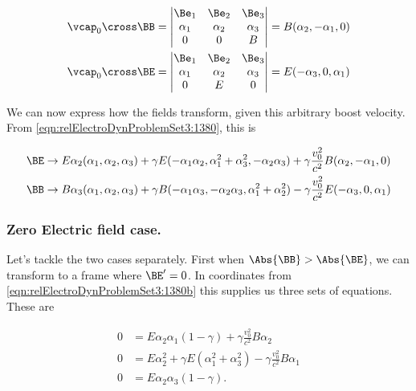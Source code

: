 \begin{align*}
\vcap_0 \cross \BB &= 
        \begin{vmatrix} 
        \Be_1 & \Be_2 & \Be_3 \\
        \alpha_1 & \alpha_2 & \alpha_3 \\
        0 & 0 & B 
        \end{vmatrix} 
= B (\alpha_2, -\alpha_1, 0) \\
\vcap_0 \cross \BE &= 
        \begin{vmatrix} 
        \Be_1 & \Be_2 & \Be_3 \\
        \alpha_1 & \alpha_2 & \alpha_3 \\
        0 & E & 0 
        \end{vmatrix} 
= E (-\alpha_3, 0, \alpha_1)
\end{align*}

We can now express how the fields transform, given this arbitrary boost velocity.  From \ref{eqn:relElectroDynProblemSet3:1380}, this is

\begin{align}\label{eqn:relElectroDynProblemSet3:1380b}
\BE &\rightarrow 
E \alpha_2 (\alpha_1, \alpha_2, \alpha_3) 
+ \gamma E (-\alpha_1 \alpha_2, \alpha_1^2 + \alpha_3^2, -\alpha_2 \alpha_3) 
+ \gamma \frac{v_0^2}{c^2} 
B (\alpha_2, -\alpha_1, 0) \\
\BB &\rightarrow
B \alpha_3 (\alpha_1, \alpha_2, \alpha_3)
+ \gamma B (-\alpha_1 \alpha_3, -\alpha_2 \alpha_3, \alpha_1^2 + \alpha_2^2)  
- \gamma \frac{v_0^2}{c^2} E (-\alpha_3, 0, \alpha_1)
\end{align}

\subsubsection{Zero Electric field case.}

Let's tackle the two cases separately.  First when $\Abs{\BB} > \Abs{\BE}$, we can transform to a frame where $\BE'=0$.  In coordinates from \ref{eqn:relElectroDynProblemSet3:1380b} this supplies us three sets of equations.  These are

\begin{align}\label{eqn:relElectroDynProblemSet3:1660}
0 &= E \alpha_2 \alpha_1 (1 - \gamma) + \gamma \frac{v_0^2}{c^2} B \alpha_2  \\
0 &= E \alpha_2^2 + \gamma E (\alpha_1^2 + \alpha_3^2) - \gamma \frac{v_0^2}{c^2} B \alpha_1  \\
0 &= E \alpha_2 \alpha_3 (1 - \gamma).
\end{align}

